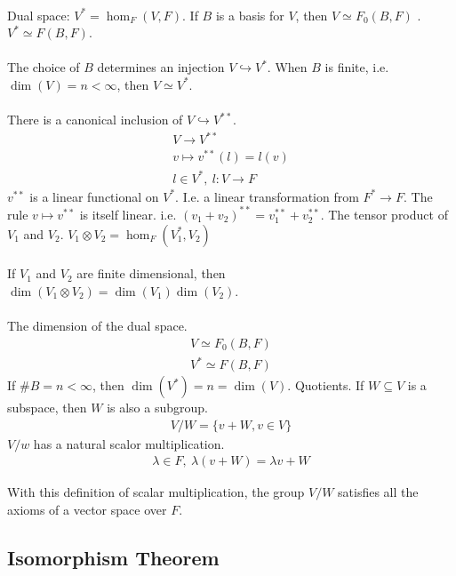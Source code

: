 \documentclass[class=scrartcl, crop=false]{standalone}
\begin{document}
\begin{enumerate}
\begin{gather*}
  \end{gather*} 
  \ii
  Dual space: $V^* = \hom_F(V, F)$. If $B$ is a basis for $V$, then $V \simeq F_0(B, F)$ . $V^* \simeq F(B, F)$.
  \\\\
  The choice of $B$ determines an injection $V \hookrightarrow V^*$. When $B$ is finite, i.e. $\dim(V) = n < \infty$, then $V \simeq V^*$.
  \\\\
  There is a canonical inclusion of $V \hookrightarrow V^{**}$.
  \begin{gather*}
    V \to V^{**} \\
    v \mapsto v^{**}(l) = l(v) \\
    l \in V^*, \ l: V \to F
  \end{gather*} 
  $v^{**}$ is a linear functional on $V^*$. I.e. a linear transformation from $F^* \to F$. The rule $v \mapsto v^{**}$ is itself linear. i.e. $(v_1 + v_2)^{**} = v_1^{**} + v_2^{**}$.
  \ii
  The tensor product of $V_1$ and $V_2$. $V_1 \otimes V_2 = \hom_F(V_1^*, V_2)$ %
  \\\\
  If $V_1$ and $V_2$ are finite dimensional, then $\dim(V_1 \otimes V_2) = \dim(V_1)\dim(V_2)$.
  \\\\
  The dimension of the dual space.
  \begin{gather*}
    V \simeq F_0(B, F) \\
    V^* \simeq F(B, F)
  \end{gather*} 
  If $\#B = n < \infty$, then $\dim(V^*) = n = \dim(V)$.
  \ii
  Quotients. If $W \subseteq V$ is a subspace, then $W$ is also a subgroup.
  \begin{gather*}
    V / W = \{v + W, v \in V\}
  \end{gather*} 
  $V / w$ has a natural scalor multiplication.
  \begin{gather*}
    \lambda \in F, \ \lambda(v + W) = \lambda v + W
  \end{gather*} 
  \begin{exercise}
    With this definition of scalar multiplication, the group $V / W$ satisfies all the axioms of a vector space over $F$.
  \end{exercise} 
\end{enumerate} 

\subsection{Isomorphism Theorem}
\end{document}
